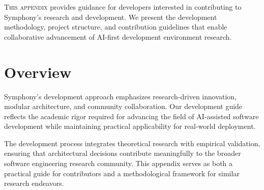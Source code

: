 \label{app:development-guide}


\lettrine{T}{his appendix} provides guidance for developers interested in contributing to Symphony's research and development. We present the development methodology, project structure, and contribution guidelines that enable collaborative advancement of AI-first development environment research.

\section*{Overview}

Symphony's development approach emphasizes research-driven innovation, modular architecture, and community collaboration. Our development guide reflects the academic rigor required for advancing the field of AI-assisted software development while maintaining practical applicability for real-world deployment.

The development process integrates theoretical research with empirical validation, ensuring that architectural decisions contribute meaningfully to the broader software engineering research community. This appendix serves as both a practical guide for contributors and a methodological framework for similar research endeavors.







